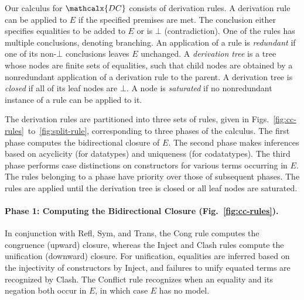 \documentclass[smallcondensed,draft]{svjour3}
\newcommand\Sig{\mathrm{\Sigma}}
\newcommand\const[1]{\textsf{#1}}
\newcommand{\Ec}{E}
\newcommand{\tEc}{\Terms(\Ec)}
\newcommand{\rn}[1]{\textsf{#1}}
\newcommand{\thD}{\mathcalx{DC}}
\newcommand\Terms{\mathcalx{T}}
\newcommand\negvthinspace{\kern-0.083333em}
\begin{document}
Our calculus for $\thD$ consists of derivation rules.
A derivation rule can be applied to $\Ec$ if %
the specified
premises are met.
The conclusion either specifies equalities to be added to $\Ec$
or is $\bot$ (contradiction).
One of the rules has multiple conclusions, %
denoting branching.
%
An application of a rule is \emph{redundant} if one of its non-$\bot$
conclusions leaves $\Ec$ unchanged.
A \emph{derivation tree} is a %
tree whose nodes are finite sets of
equalities, such that child nodes are obtained by a nonredundant application of a
derivation rule to the parent. A derivation tree is \emph{closed} if all of
its leaf nodes are $\bot$. A node is \emph{saturated} if no nonredundant
instance of a rule can be applied to it.

The derivation rules are partitioned into three sets of rules, given in
Figs.\ \ref{fig:cc-rules}~to~\ref{fig:split-rule}, corresponding to three
phases of the calculus. The first phase computes the bidirectional closure of $\Ec$. The second
phase makes inferences based on acyclicity (for datatypes) and uniqueness
(for codatatypes).
The third phase performs case distinctions on constructors for
various terms occurring in $\Ec$.
%
The rules belonging to a phase have priority over those of %
subsequent
phases. The rules are applied until the derivation tree is closed or all leaf nodes
are saturated.


\paragraph{Phase 1: Computing the Bidirectional Closure \rm(Fig.~\ref{fig:cc-rules}).}
In conjunction with \rn{Refl}, \rn{Sym}, and \rn{Trans}, the \rn{Cong} rule computes the congruence (upward) closure,
whereas the \rn{Inject} and \rn{Clash} rules %
compute the unification (downward) closure.
For unification, %
equalities are inferred based on the injectivity of constructors by \rn{Inject},
and failures to unify equated terms are recognized by \rn{Clash}.
The \rn{Conflict} rule recognizes when an equality and its negation both occur in $\Ec$, in which case $\Ec$ has no model.
\end{document}
